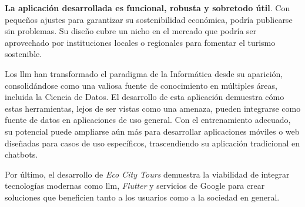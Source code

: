 \textbf{La aplicación desarrollada es funcional, robusta y sobretodo útil}. Con pequeños ajustes para garantizar su sostenibilidad económica, podría publicarse sin problemas. Su diseño cubre un nicho en el mercado que podría ser aprovechado por instituciones locales o regionales para fomentar el turismo sostenible.

Los \acrfull{llm} han transformado el paradigma de la Informática desde su aparición, consolidándose como una valiosa fuente de conocimiento en múltiples áreas, incluida la Ciencia de Datos. El desarrollo de esta aplicación demuestra cómo estas herramientas, lejos de ser vistas como una amenaza, pueden integrarse como fuente de datos en aplicaciones de uso general. Con el entrenamiento adecuado, su potencial puede ampliarse aún más para desarrollar aplicaciones móviles o web diseñadas para casos de uso específicos, trascendiendo su aplicación tradicional en chatbots.

Por último, el desarrollo de \textit{Eco City Tours} demuestra la viabilidad de integrar tecnologías modernas como \acrshort{llm}, \textit{Flutter} y servicios de Google para crear soluciones que beneficien tanto a los usuarios como a la sociedad en general.



